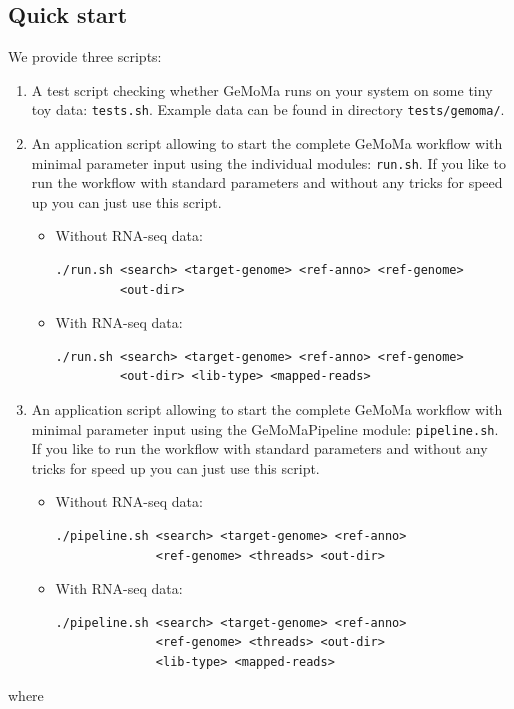 \documentclass{article}
\begin{document}
\subsection{Quick start}
We provide three scripts:
\begin{enumerate}
	\item A test script checking whether GeMoMa runs on your system on some tiny toy data: \texttt{tests.sh}. Example data can be found in directory \texttt{tests/gemoma/}.
	\item An application script allowing to start the complete GeMoMa workflow with minimal parameter input using the individual modules: \texttt{run.sh}. If you like to run the workflow with standard parameters and without any tricks for speed up you can just use this script.
\begin{itemize}
	\item Without RNA-seq data:
\begin{verbatim}
./run.sh <search> <target-genome> <ref-anno> <ref-genome>
         <out-dir>
\end{verbatim}	
	\item With RNA-seq data:
\begin{verbatim}
./run.sh <search> <target-genome> <ref-anno> <ref-genome>
         <out-dir> <lib-type> <mapped-reads>
\end{verbatim}
\end{itemize}
	\item An application script allowing to start the complete GeMoMa workflow with minimal parameter input using the GeMoMaPipeline module: \texttt{pipeline.sh}. If you like to run the workflow with standard parameters and without any tricks for speed up you can just use this script.
\begin{itemize}
	\item Without RNA-seq data:
\begin{verbatim}
./pipeline.sh <search> <target-genome> <ref-anno>
              <ref-genome> <threads> <out-dir>
\end{verbatim}	
	\item With RNA-seq data:
\begin{verbatim}
./pipeline.sh <search> <target-genome> <ref-anno>
              <ref-genome> <threads> <out-dir>
              <lib-type> <mapped-reads>
\end{verbatim}
\end{itemize}
\end{enumerate}
where
\end{document}
